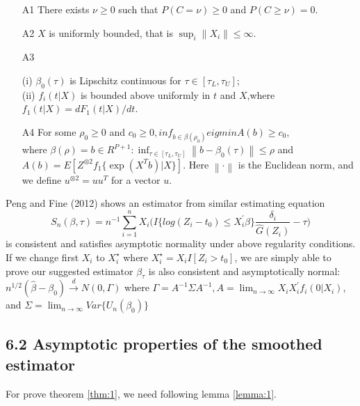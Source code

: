 \documentclass[12pt]{article}
\begin{document}
	\begin{enumerate}
		\item[A1] There exists $\nu \ge 0$ such that $P(C = \nu) \ge 0$ and $P(C \ge \nu) =0$.
		\item[A2] $X$ is uniformly bounded, that is $\sup_i \left\lVert X_i \right\rVert \le \infty$. 
		\item[A3] 
		\begin{flushleft}
			(i) $\beta_0(\tau)$ is Lipschitz continuous for $\tau \in [\tau_L, \tau_U]$;\\
			(ii) $f_i(t|X)$ is bounded above uniformly in $t$ and $X$,where $f_1(t|X) = dF_1(t|X)/dt$.
		\end{flushleft}
		\item[A4] For some $\rho_0 \ge 0$ and $c_0 \ge 0, inf_{b \in \beta(\rho_0)} eigmin A(b) \geq c_0$,\\ where $\beta(\rho)={b\in R^{P+1} : \inf_{\tau \in [\tau_L, \tau_U]}
			\left\lVert b-\beta_0(\tau) \right\rVert \leq \rho}$ and $A(b) = E[Z^{\otimes2}f_1 \{\exp(X^T b)|X\}]$. Here $\left\lVert \cdot \right\rVert$ is the Euclidean norm, and we define $u^{\otimes2} = uu^T$ for a vector $u$.
	\end{enumerate}
	
	\noindent Peng and Fine (2012) shows an estimator from similar estimating equation
	\begin{equation} \label{eq:6}
	S_n(\beta, \tau)=n^{-1}\sum_{i=1}^{n}X_i \Big( I\{log(Z_i-t_0) \leq X_i^{\prime} \beta\} \frac{\delta_i}{\hat{G}(Z_i)}  -\tau \Big)
	\end{equation}
	\noindent is consistent and satisfies asymptotic normality under above regularity conditions. If we change first $X_i$ to $X_i^\star$ where $X_i^\star = X_i I[Z_i>t_0]$, we are simply able to prove our suggested estimator $\beta_\tau$ is also consistent and asymptotically normal:
	\begin{math}
	n^{1/2}(\hat{\beta}-\beta_0) \xrightarrow{d} N(0, \Gamma)
	\end{math}
	\noindent where $\Gamma = A^{-1} \Sigma A^{-1}, A = \lim_{n \rightarrow \infty} X_i X_i^{\prime}f_i(0|X_i)$, and $\Sigma = \lim_{n \rightarrow \infty} Var\{U_n(\beta_0)\}$
	
	\subsection{6.2 Asymptotic properties of the smoothed estimator}
	\noindent For prove theorem \ref{thm:1}, we need following lemma \ref{lemma:1}.\\
	
\end{document}
